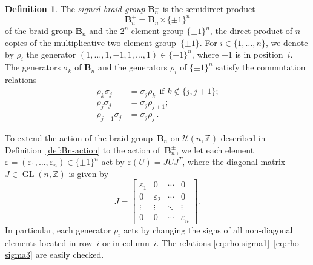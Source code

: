 \documentclass[11pt, letterpaper]{amsart}
\theoremstyle{definition}
\newtheorem{definition}[theorem]{Definition}
\numberwithin{equation}{section}
\def\ZZ{{\mathbb Z}}
\def\GL{{\operatorname{GL}}}
\begin{document}
\begin{definition}
\label{def:signed-braid-group}
The \emph{signed braid group} $\mathbf{B}_n^\pm$ is the semidirect product
\begin{equation*}
\mathbf{B}_n^\pm = \mathbf{B}_n \rtimes \{\pm1\}^n
\end{equation*}
of the braid group $\mathbf{B}_n$ and the $2^n$-element group $\{\pm1\}^n$, 
the direct product of $n$ copies of the multiplicative two-element group~$\{\pm1\}$. 
For $i\in\{1,\dots,n\}$, we denote by $\rho_i$ the generator $(1,\dots,1,-1,1,\dots,1)\in\{\pm1\}^n$, 
where $-1$ is in position~$i$. 
The generators $\sigma_k$ of $\mathbf{B}_n$ and 
the generators $\rho_i$ of $\{\pm1\}^n$
satisfy the commutation relations
\begin{align}
\label{eq:rho-sigma1}
\rho_k \sigma_j &= \sigma_j \rho_k \ \  \text{if $k\notin \{j,j+1\}$;}\\
\label{eq:rho-sigma2}
\rho_j \sigma_j &= \sigma_j \rho_{j+1};\\
\label{eq:rho-sigma3}
\rho_{j+1} \sigma_j &= \sigma_j \rho_j\,. 
\end{align}

To extend the action of the braid group~$\mathbf{B}_n$ on $\mathcal{U}(n,\ZZ)$ 
described in Definition~\ref{def:Bn-action} to the action of~$\mathbf{B}_n^\pm$, 
we let each 
element $\varepsilon=(\varepsilon_1,\dots,\varepsilon_n)\in\{\pm1\}^n$ 
act by 
$\varepsilon(U)=JUJ^T$, 
where the diagonal matrix $J\in\GL(n,\ZZ)$ is given by 
\begin{equation*}
J=
\begin{bmatrix}
\varepsilon_1 & 0 & \cdots & 0 \\
0 & \varepsilon_2 & \cdots & 0 \\
\vdots & \vdots & \ddots & \vdots \\
0 & 0 & \cdots & \varepsilon_n
\end{bmatrix}. 
\end{equation*}
In particular, each generator $\rho_i$ acts by changing the signs of all non-diagonal elements located 
in row~$i$ or in column~$i$. 
The relations \eqref{eq:rho-sigma1}--\eqref{eq:rho-sigma3} are easily checked. 
\end{definition}
\end{document}

